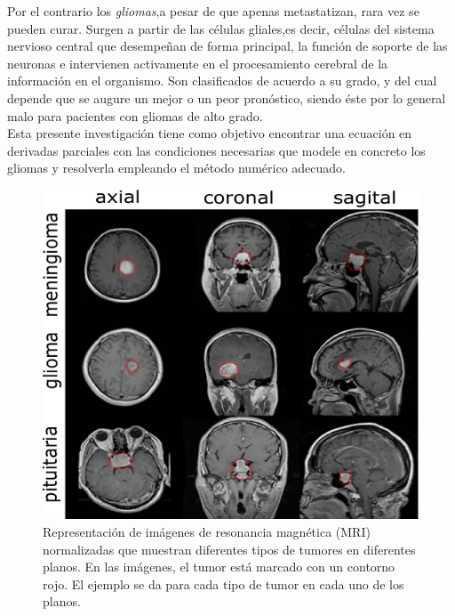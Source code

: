 Por el contrario los \textit{gliomas},a pesar de que apenas metastatizan, rara vez se pueden curar. Surgen a partir de las células gliales,es decir, células del sistema nervioso central que desempeñan de forma principal, la función de soporte de las neuronas e intervienen activamente en el procesamiento cerebral de la información en el organismo. Son clasificados de acuerdo a su grado, y del cual depende que se augure un mejor o un peor pronóstico, siendo éste por lo general malo para pacientes con gliomas de alto grado.\\

Esta presente investigación tiene como objetivo encontrar una ecuación en derivadas parciales con las condiciones necesarias que modele en concreto los gliomas y resolverla empleando el método numérico adecuado.\\

\begin{figure}[H]
	\centering
	\includegraphics[scale=1.2]{marcoteorico/tumorcerebral.pdf}			
	\caption{{\small {\footnotesize Representación de imágenes de resonancia magnética (MRI) normalizadas que muestran diferentes tipos de tumores en diferentes planos. En las imágenes, el tumor está marcado con un contorno rojo. El ejemplo se da para cada tipo de tumor en cada uno de los planos.}}}
\end{figure}

\newpage
